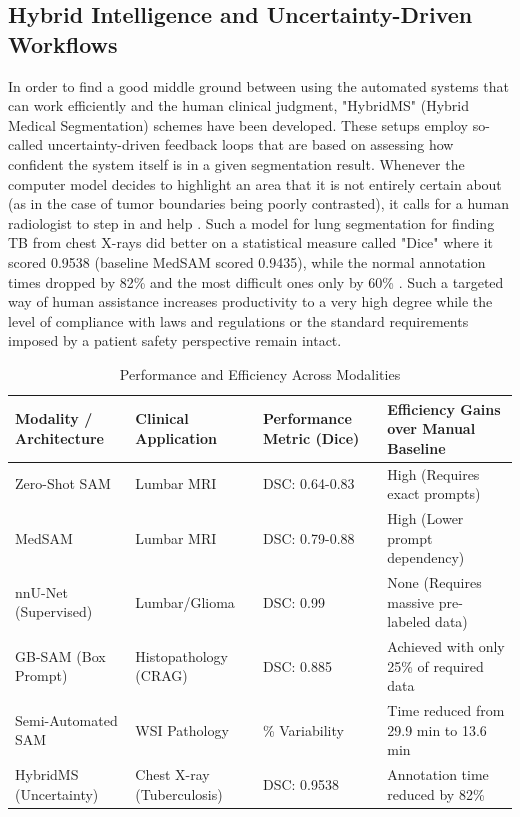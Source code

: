 \documentclass[10pt, conference, letterpaper]{IEEEtran}
\begin{document}
\subsection{Hybrid Intelligence and Uncertainty-Driven Workflows}
In order to find a good middle ground between using the automated systems that can work efficiently and the human clinical judgment, "HybridMS" (Hybrid Medical Segmentation) schemes have been developed. These setups employ so-called uncertainty-driven feedback loops that are based on assessing how confident the system itself is in a given segmentation result. Whenever the computer model decides to highlight an area that it is not entirely certain about (as in the case of tumor boundaries being poorly contrasted), it calls for a human radiologist to step in and help \cite{ref21}. Such a model for lung segmentation for finding TB from chest X-rays did better on a statistical measure called "Dice" where it scored 0.9538 (baseline MedSAM scored 0.9435), while the normal annotation times dropped by 82\% and the most difficult ones only by 60\% \cite{ref21}. Such a targeted way of human assistance increases productivity to a very high degree while the level of compliance with laws and regulations or the standard requirements imposed by a patient safety perspective remain intact.

\begin{table}[!t]
\centering
\caption{Performance and Efficiency Across Modalities}
\label{tab:performance}
\footnotesize
\renewcommand{\arraystretch}{1.25}
\begin{tabularx}{\textwidth}{@{} >{\raggedright\arraybackslash}p{} >{\raggedright\arraybackslash}X >{\raggedright\arraybackslash}X >{\raggedright\arraybackslash}X @{}}
\toprule
\textbf{Modality / Architecture} & \textbf{Clinical Application} & \textbf{Performance Metric (Dice)} & \textbf{Efficiency Gains over Manual Baseline} \\
\midrule
Zero-Shot SAM & Lumbar MRI & DSC: 0.64-0.83 & High (Requires exact prompts) \\
MedSAM & Lumbar MRI & DSC: 0.79-0.88 & High (Lower prompt dependency) \\
nnU-Net (Supervised) & Lumbar/Glioma & DSC: 0.99 & None (Requires massive pre-labeled data) \\
GB-SAM (Box Prompt) & Histopathology (CRAG) & DSC: 0.885 & Achieved with only 25\% of required data \\
Semi-Automated SAM & WSI Pathology & 2\% Variability & Time reduced from 29.9 min to 13.6 min \\
HybridMS (Uncertainty) & Chest X-ray (Tuberculosis) & DSC: 0.9538 & Annotation time reduced by 82\% \\
\bottomrule
\end{tabularx}
\end{table}
\end{document}
